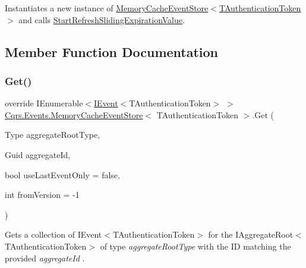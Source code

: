 Instantiates a new instance of \hyperlink{classCqrs_1_1Events_1_1MemoryCacheEventStore_a4de9139e05d35cb62ba295569a1dc94f_a4de9139e05d35cb62ba295569a1dc94f}{Memory\+Cache\+Event\+Store$<$\+T\+Authentication\+Token$>$} and calls \hyperlink{classCqrs_1_1Events_1_1MemoryCacheEventStore_ac2a6da8b2faac7bd5f333bff592fc8f2_ac2a6da8b2faac7bd5f333bff592fc8f2}{Start\+Refresh\+Sliding\+Expiration\+Value}. 



\subsection{Member Function Documentation}
\mbox{\label{classCqrs_1_1Events_1_1MemoryCacheEventStore_a1391c260f52f5cf18058cf88ad2d16de_a1391c260f52f5cf18058cf88ad2d16de}} 
\subsubsection{\texorpdfstring{Get()}{Get()}\hspace{0.1cm}{\footnotesize\ttfamily [1/2]}}
{\footnotesize\ttfamily override I\+Enumerable$<$\hyperlink{interfaceCqrs_1_1Events_1_1IEvent}{I\+Event}$<$T\+Authentication\+Token$>$ $>$ \hyperlink{classCqrs_1_1Events_1_1MemoryCacheEventStore}{Cqrs.\+Events.\+Memory\+Cache\+Event\+Store}$<$ T\+Authentication\+Token $>$.Get (\begin{DoxyParamCaption}\item[{Type}]{aggregate\+Root\+Type,  }\item[{Guid}]{aggregate\+Id,  }\item[{bool}]{use\+Last\+Event\+Only = {\ttfamily false},  }\item[{int}]{from\+Version = {\ttfamily -\/1} }\end{DoxyParamCaption})\hspace{0.3cm}{\ttfamily [virtual]}}



Gets a collection of I\+Event$<$\+T\+Authentication\+Token$>$ for the I\+Aggregate\+Root$<$\+T\+Authentication\+Token$>$ of type {\itshape aggregate\+Root\+Type}  with the ID matching the provided {\itshape aggregate\+Id} . 


